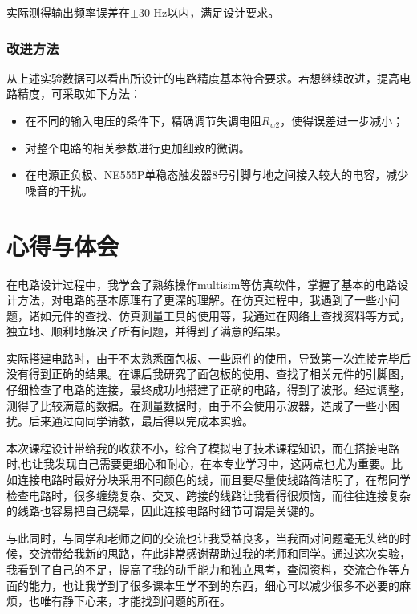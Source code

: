 \documentclass[12pt]{article}
\begin{document}
实际测得输出频率误差在$\pm 30$ Hz以内，满足设计要求。

\newpage
\subsubsection*{改进方法}

从上述实验数据可以看出所设计的电路精度基本符合要求。若想继续改进，提高电路精度，可采取如下方法：

\begin{itemize}
    \item 在不同的输入电压的条件下，精确调节失调电阻$R_{w2}$，使得误差进一步减小；
    \item 对整个电路的相关参数进行更加细致的微调。
    \item 在电源正负极、NE555P单稳态触发器8号引脚与地之间接入较大的电容，减少噪音的干扰。
\end{itemize}

\section{心得与体会}

在电路设计过程中，我学会了熟练操作multisim等仿真软件，掌握了基本的电路设计方法，对电路的基本原理有了更深的理解。在仿真过程中，我遇到了一些小问题，诸如元件的查找、仿真测量工具的使用等，我通过在网络上查找资料等方式，独立地、顺利地解决了所有问题，并得到了满意的结果。

实际搭建电路时，由于不太熟悉面包板、一些原件的使用，导致第一次连接完毕后没有得到正确的结果。在课后我研究了面包板的使用、查找了相关元件的引脚图，仔细检查了电路的连接，最终成功地搭建了正确的电路，得到了波形。经过调整，测得了比较满意的数据。在测量数据时，由于不会使用示波器，造成了一些小困扰。后来通过向同学请教，最后得以完成本实验。

本次课程设计带给我的收获不小，综合了模拟电子技术课程知识，而在搭接电路时,也让我发现自己需要更细心和耐心，在本专业学习中，这两点也尤为重要。比如连接电路时最好分块采用不同颜色的线，而且要尽量使线路简洁明了，在帮同学检查电路时，很多缠绕复杂、交叉、跨接的线路让我看得很烦恼，而往往连接复杂的线路也容易把自己绕晕，因此连接电路时细节可谓是关键的。

与此同时，与同学和老师之间的交流也让我受益良多，当我面对问题毫无头绪的时候，交流带给我新的思路，在此非常感谢帮助过我的老师和同学。通过这次实验，我看到了自己的不足，提高了我的动手能力和独立思考，查阅资料，交流合作等方面的能力，也让我学到了很多课本里学不到的东西，细心可以减少很多不必要的麻烦，也唯有静下心来，才能找到问题的所在。
\end{document}
